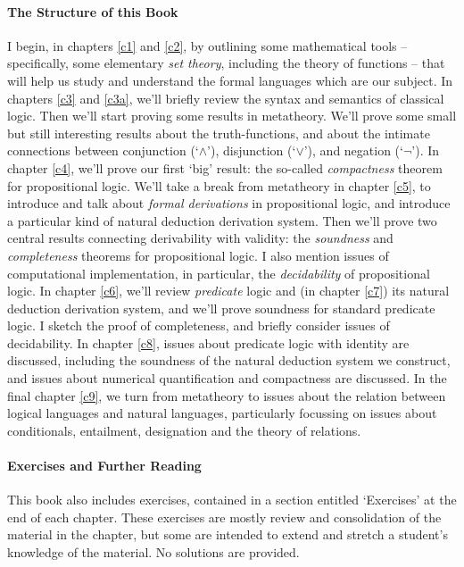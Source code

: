 \documentclass[openany,leqno,11pt,draft]{book}
\theoremstyle{break}
\theoremstyle{definition}
\theoremstyle{remark}
\begin{document}
\paragraph{The Structure of this Book} I begin, in chapters \ref{c1} and \ref{c2}, by outlining some mathematical tools – specifically, some elementary \emph{set theory}, including the theory of functions – that will help us study and understand the formal languages which are our subject. In chapters \ref{c3} and \ref{c3a}, we'll briefly review the syntax and semantics of classical logic. Then we'll start proving some results in metatheory. We'll prove some small but still interesting results about the truth-functions, and about the intimate connections between conjunction (‘$\wedge$’), disjunction (‘$\vee$’), and negation (‘$¬$’). In chapter \ref{c4}, we'll prove our first `big' result: the so-called \emph{compactness} theorem for propositional logic. We'll take a break from metatheory in chapter \ref{c5}, to introduce and talk about \emph{formal derivations} in propositional logic, and introduce a particular kind of natural deduction derivation system. Then we'll prove two central results connecting derivability with validity: the \emph{soundness} and \emph{completeness} theorems for propositional logic. I also mention issues of computational implementation, in particular, the \emph{decidability} of propositional logic.
In chapter \ref{c6}, we'll review \emph{predicate} logic and (in chapter \ref{c7}) its natural deduction derivation system, and we'll prove soundness for standard predicate logic. I sketch the proof of completeness, and briefly consider issues of decidability. In chapter \ref{c8}, issues about predicate logic with identity are discussed, including the soundness of the natural deduction system we construct, and issues about numerical quantification and compactness are discussed. In the final chapter \ref{c9}, we turn from metatheory to issues about the relation between logical languages and natural languages, particularly focussing on issues about conditionals, entailment, designation and the theory of relations.

\paragraph{Exercises and Further Reading} This book also includes exercises, contained in a section entitled `Exercises' at the end of each chapter. These exercises are mostly review and consolidation of the material in the chapter, but some are intended to extend and stretch a student's knowledge of the material. No solutions are provided.
\end{document}
